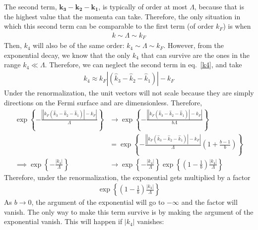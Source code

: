 \documentclass[14pt]{extarticle}
\begin{document}
The second term, \(\mathbf{k_3} - \mathbf{k_2} - \mathbf{k_1}\), is typically of order at most \(\Lambda\), because that is the highest value that the momenta can take. Therefore, the only situation in which this second term can be comparable to the first term (of order \(k_F\)) is when
\begin{equation}\begin{aligned}
k \sim \Lambda \sim k_F
\end{aligned}\end{equation}
Then, \(k_4\) will also be of the same order: \(k_4 \sim \Lambda \sim k_F\). However, from the exponential decay, we know that the only \(k_4\) that can survive are the ones in the range \(k_4 \ll \Lambda\). Therefore, we can neglect the second term in eq.~\ref{k4}, and take
\begin{equation}\begin{aligned}
	k_4 \approx k_F\left|\left(\hat k_3 - \hat k_2 - \hat k_1\right)\right| - k_F
\end{aligned}\end{equation}
Under the renormalization, the unit vectors will not scale because they are simply directions on the Fermi surface and are dimensionless. Therefore,
\begin{equation}\begin{aligned}
	\exp\left\{-\frac{\left|\left|k_F\left(\hat k_3 - \hat k_2 - \hat k_1\right)\right| - k_F\right|}{\Lambda}\right\}&\rightarrow\exp\left\{-\frac{\left|\left|k_F\left(\hat k_3 - \hat k_2 - \hat k_1\right)\right| - k_F\right|}{b\Lambda}\right\}\\
															 &=\exp\left\{-\frac{\left|\left|k_F\left(\hat k_3 - \hat k_2 - \hat k_1\right)\right| - k_F\right|}{\Lambda}\left(1 + \frac{b-1}{b}\right)\right\}\\
	\implies \exp\left\{-\frac{|k_4|}{\Lambda}\right\} &\rightarrow \exp\left\{-\frac{|k_4|}{\Lambda}\right\}\exp\left\{\left(1 - \frac{1}{b}\right)\frac{|k_4|}{\Lambda}\right\}
\end{aligned}\end{equation}
Therefore, under the renormalization, the exponential gets multiplied by a factor
\begin{equation}\begin{aligned}
	\exp\left\{\left(1 - \frac{1}{b}\right)\frac{|k_4|}{\Lambda}\right\}
\end{aligned}\end{equation}
As \(b \rightarrow 0\), the argument of the exponential will go to \(-\infty\) and the factor will vanish. The only way to make this term survive is by making the argument of the exponential vanish. This will happen if \(|k_4|\) vanishes:
\end{document}
